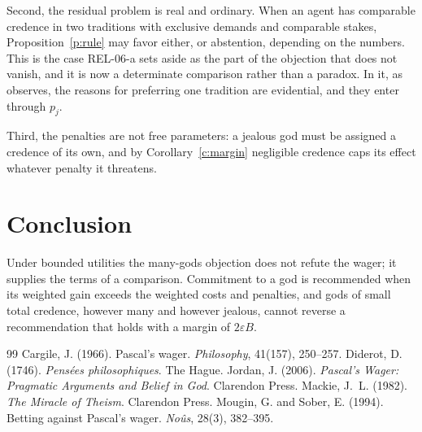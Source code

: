 \documentclass{situationist-preprint}
\begin{document}
Second, the residual problem is real and ordinary. When an agent has comparable credence in two traditions with exclusive demands and comparable stakes, Proposition~\ref{p:rule} may favor either, or abstention, depending on the numbers. This is the case REL-06-a sets aside as the part of the objection that does not vanish, and it is now a determinate comparison rather than a paradox. In it, as \citet{Jordan2006} observes, the reasons for preferring one tradition are evidential, and they enter through $p_j$.

Third, the penalties are not free parameters: a jealous god must be assigned a credence of its own, and by Corollary~\ref{c:margin} negligible credence caps its effect whatever penalty it threatens.

\section{Conclusion}

Under bounded utilities the many-gods objection does not refute the wager; it supplies the terms of a comparison. Commitment to a god is recommended when its weighted gain exceeds the weighted costs and penalties, and gods of small total credence, however many and however jealous, cannot reverse a recommendation that holds with a margin of $2\varepsilon B$.

\begin{thebibliography}{99}\small
{} Cargile, J. (1966). Pascal's wager. \emph{Philosophy}, 41(157), 250--257.
 Diderot, D. (1746). \emph{Pens\'ees philosophiques}. The Hague.
 Jordan, J. (2006). \emph{Pascal's Wager: Pragmatic Arguments and Belief in God}. Clarendon Press.
 Mackie, J.~L. (1982). \emph{The Miracle of Theism}. Clarendon Press.
 Mougin, G. and Sober, E. (1994). Betting against Pascal's wager. \emph{No\^us}, 28(3), 382--395.
\end{thebibliography}
\end{document}
